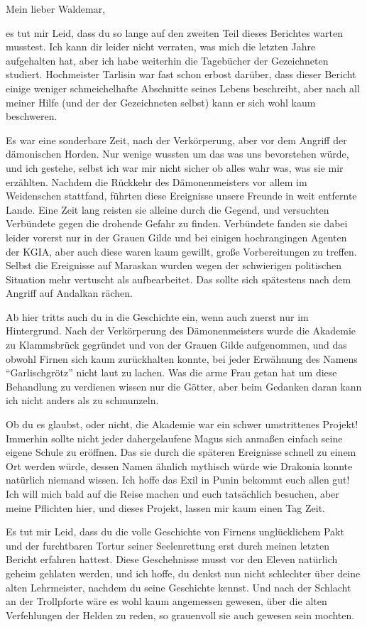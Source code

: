 Mein lieber Waldemar,

es tut mir Leid, dass du so lange auf den zweiten Teil dieses Berichtes warten musstest. 
Ich kann dir leider nicht verraten, was mich die letzten Jahre aufgehalten hat, aber ich habe weiterhin die Tagebücher der Gezeichneten studiert.
Hochmeister Tarlisin war fast schon erbost darüber, dass dieser Bericht einige weniger schmeichelhafte Abschnitte seines Lebens beschreibt, aber nach all meiner Hilfe (und der der Gezeichneten selbst) kann er sich wohl kaum beschweren.

Es war eine sonderbare Zeit, nach der Verkörperung, aber vor dem Angriff der dämonischen Horden.
Nur wenige wussten um das was uns bevorstehen würde, und ich gestehe, selbst ich war mir nicht sicher ob alles wahr was, was sie mir erzählten.
Nachdem die Rückkehr des Dämonenmeisters vor allem im Weidenschen stattfand, führten diese Ereignisse unsere Freunde in weit entfernte Lande.
Eine Zeit lang reisten sie alleine durch die Gegend, und versuchten Verbündete gegen die drohende Gefahr zu finden.
Verbündete fanden sie dabei leider vorerst nur in der Grauen Gilde und bei einigen hochrangingen Agenten der KGIA, aber auch diese waren kaum gewillt, große Vorbereitungen zu treffen.
Selbst die Ereignisse auf Maraskan wurden wegen der schwierigen politischen Situation mehr vertuscht als aufbearbeitet.
Das sollte sich spätestens nach dem Angriff auf Andalkan rächen.

Ab hier tritts auch du in die Geschichte ein, wenn auch zuerst nur im Hintergrund.
Nach der Verkörperung des Dämonenmeisters wurde die Akademie zu Klammsbrück gegründet und von der Grauen Gilde aufgenommen, und das obwohl Firnen sich kaum zurückhalten konnte, bei jeder Erwähnung des Namens ``Garlischgrötz'' nicht laut zu lachen. Was die arme Frau getan hat um diese Behandlung zu verdienen wissen nur die Götter, aber beim Gedanken daran kann ich nicht anders als zu schmunzeln.

Ob du es glaubst, oder nicht, die Akademie war ein schwer umstrittenes Projekt! Immerhin sollte nicht jeder dahergelaufene Magus sich anmaßen einfach seine eigene Schule zu eröffnen. Das sie durch die späteren Ereignisse schnell zu einem Ort werden würde, dessen Namen ähnlich mythisch würde wie Drakonia konnte natürlich niemand wissen.
Ich hoffe das Exil in Punin bekommt euch allen gut! Ich will mich bald auf die Reise machen und euch tatsächlich besuchen, aber meine Pflichten hier, und dieses Projekt, lassen mir kaum einen Tag Zeit.

Es tut mir Leid, dass du die volle Geschichte von Firnens unglücklichem Pakt und der furchtbaren Tortur seiner Seelenrettung erst durch meinen letzten Bericht erfahren hattest. Diese Geschehnisse musst vor den Eleven natürlich geheim gehlaten werden, und ich hoffe, du denkst nun nicht schlechter über deine alten Lehrmeister, nachdem du seine Geschichte kennst.
Und nach der Schlacht an der Trollpforte wäre es wohl kaum angemessen gewesen, über die alten Verfehlungen der Helden zu reden, so grauenvoll sie auch gewesen sein mochten.


